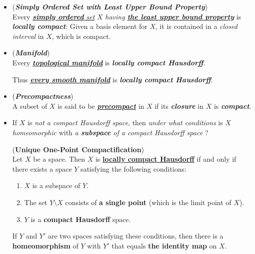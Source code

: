 \documentclass[11pt]{article}
\begin{document}
\begin{itemize}
\item \begin{example} (\emph{\textbf{Simply Ordered Set with Least Upper Bound Property}})\\
Every \underline{\emph{\textbf{simply ordered} set}} $X$ \emph{having \underline{\textbf{the least upper bound property}}} is \emph{\textbf{locally compact}}: Given a basis element for $X$, it is contained in a \emph{closed interval} in $X$, which is compact.
\end{example}

\item \begin{example} (\emph{\textbf{Manifold}}) \citep{lee2018introduction} \\
Every \underline{\emph{\textbf{topological manifold}}} is \emph{\textbf{locally compact Hausdorff}}.

Thus \underline{\emph{\textbf{every smooth manifold}}} is  \emph{\textbf{locally compact Hausdorff}}.
\end{example}

\item \begin{definition} (\emph{\textbf{Precompactness}})\\
A subset of $X$ is said to be \underline{\emph{\textbf{precompact}}} in $X$ if its \emph{\textbf{closure}} in $X$ is \emph{\textbf{compact}}.
\end{definition}


\item If $X$ is \emph{not a compact Hausdorff space}, then \emph{under what conditions} is $X$ \emph{homeomorphic} with \emph{a \textbf{subspace} of a compact Hausdorff space} ?

\begin{theorem} (\textbf{Unique One-Point Compactification}) \citep{munkres2000topology}\\
Let $X$ be a space. Then $X$ is \underline{\textbf{locally compact Hausdorff}} if and only if there exists a space $Y$ satisfying the following conditions:
\begin{enumerate}
\item $X$ is a subspace of $Y$.
\item The set $Y \setminus X$ consists of \textbf{a single point} (which is the limit point of $X$).
\item $Y$ is a \textbf{compact Hausdorff} space.
\end{enumerate} 
If $Y$ and $Y'$ are two spaces satisfying these conditions, then there is a \textbf{homeomorphism} of $Y$ with $Y'$ that equals \textbf{the identity map} on $X$.
\end{theorem}


\end{itemize}
\end{document}
